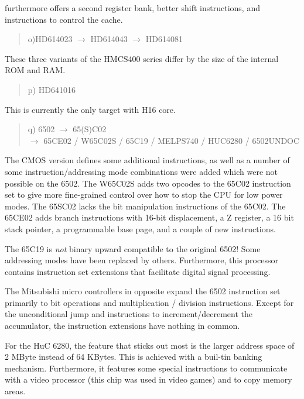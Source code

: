 \documentclass[12pt,twoside]{report}
\begin{document}
furthermore offers a second register bank, better shift instructions, and
instructions to control the cache.
\begin{quote}
o)HD614023 $\longrightarrow$ HD614043 $\longrightarrow$ HD614081
\end{quote}
These three variants of the HMCS400 series differ by the size of
the internal ROM and RAM.
\begin{quote}
p) HD641016
\end{quote}
This is currently the only target with H16 core.
\begin{quote}
q) 6502 $\rightarrow$ 65(S)C02 \\
   $\rightarrow$ 65CE02 / W65C02S / 65C19 / MELPS740 / HUC6280 / 6502UNDOC
\end{quote}
The CMOS version defines some additional instructions, as well as a number of
some instruction/addressing mode combinations were added which were not
possible on the 6502.  The W65C02S adds two opcodes to the 65C02 instruction
set to give more fine-grained control over how to stop the CPU for low power
modes.  The 65SC02 lacks the bit manipulation instructions of the
65C02.  The 65CE02 adds branch instructions with 16-bit displacement, a Z
register, a 16 bit stack pointer, a programmable base page, and a couple of
new instructions.

The 65C19 is {\em not} binary upward compatible to the original
6502! Some addressing modes have been replaced by others.
Furthermore, this processor contains instruction set extensions
that facilitate digital signal processing.

The Mitsubishi micro controllers in opposite expand
the 6502 instruction set primarily to bit operations and multiplication /
division instructions.  Except for the unconditional jump and instructions
to increment/decrement the accumulator, the instruction extensions
have nothing in common.

For the HuC 6280, the feature that sticks out most is the larger
address space of 2 MByte instead of 64 KBytes.  This is achieved
with a buil-tin banking mechanism.  Furthermore, it features some
special instructions to communicate with a video processor (this
chip was used in video games) and to copy memory areas.
\end{document}
